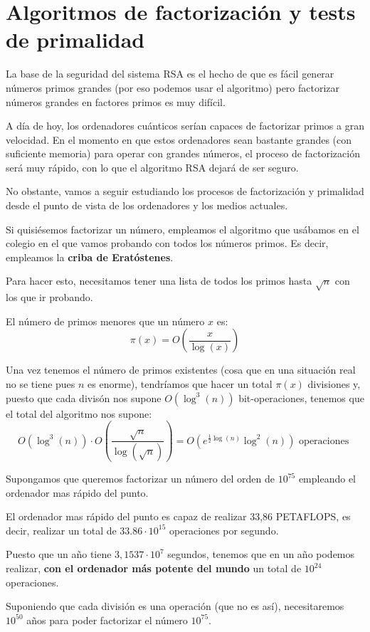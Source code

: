 \chapter{Algoritmos de factorización y tests de primalidad}

La base de la seguridad del sistema RSA es el hecho de que es fácil generar números primos grandes (por eso podemos usar el algoritmo) pero factorizar números grandes en factores primos es muy difícil.

A día de hoy, los ordenadores cuánticos serían capaces de factorizar primos a gran velocidad. En el momento en que estos ordenadores sean bastante grandes (con suficiente memoria) para operar con grandes números, el proceso de factorización será muy rápido, con lo que el algoritmo RSA dejará de ser seguro.

No obstante, vamos a seguir estudiando los procesos de factorización y primalidad desde el punto de vista de los ordenadores y los medios actuales.

Si quisiésemos factorizar un número, empleamos el algoritmo que usábamos en el colegio en el que vamos probando con todos los números primos. Es decir, empleamos la \textbf{criba de Eratóstenes}.

Para hacer esto, necesitamos tener una lista de todos los primos hasta $\sqrt{n}$ con los que ir probando. 

\begin{theorem}
El número de primos menores que un número $x$ es:
\[π(x) = O\left( \frac{x}{\log(x)}\right)\]
\end{theorem}

Una vez tenemos el número de primos existentes (cosa que en una situación real no se tiene pues $n$ es enorme), tendríamos que hacer un total $π(x)$ divisiones y, puesto que cada divisón nos supone $O(\log^3(n))$ bit-operaciones, tenemos que el total del algoritmo nos supone:
\[O(\log^3(n))\cdot O\left(\frac{\sqrt{n}}{\log(\sqrt{n})}\right) = O\left( e^{\frac{1}{2}\log(n)}\log^2(n)\right) \text{ operaciones }\]

\begin{example}
Supongamos que queremos factorizar un número del orden de $10^{75}$ empleando el ordenador mas rápido del punto.

El ordenador mas rápido del punto es capaz de realizar 33,86 PETAFLOPS, es decir, realizar un total de $33.86 \cdot 10^{15}$ operaciones por segundo.

Puesto que un año tiene $3,1537 \cdot 10^{7}$ segundos, tenemos que en un año podemos realizar, \textbf{con el ordenador más potente del mundo} un total de $10^{24}$ operaciones.

Suponiendo que cada división es una operación (que no es así), necesitaremos $10^{50}$ años para poder factorizar el número $10^{75}$.
\end{example}

